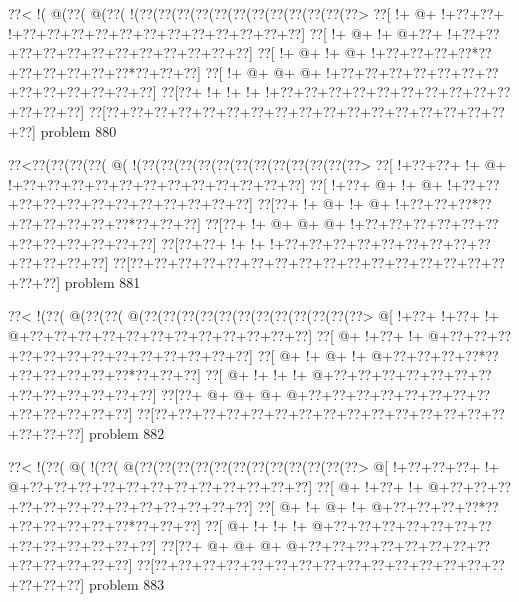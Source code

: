 \vbox{\vbox{\goo
\0??<\- !(\- @(\0??(\- @(\0??(\- !(\0??(\0??(\0??(\0??(\0??(\0??(\0??(\0??(\0??(\0??(\0??(\0??>
\0??[\- !+\- @+\- !+\0??+\0??+\- !+\0??+\0??+\0??+\0??+\0??+\0??+\0??+\0??+\0??+\0??+\0??+\0??]
\0??[\- !+\- @+\- !+\- @+\0??+\- !+\0??+\0??+\0??+\0??+\0??+\0??+\0??+\0??+\0??+\0??+\0??+\0??]
\0??[\- !+\- @+\- !+\- @+\- !+\0??+\0??+\0??+\0??*\0??+\0??+\0??+\0??+\0??+\0??*\0??+\0??+\0??]
\0??[\- !+\- @+\- @+\- @+\- !+\0??+\0??+\0??+\0??+\0??+\0??+\0??+\0??+\0??+\0??+\0??+\0??+\0??]
\0??[\0??+\- !+\- !+\- !+\- !+\0??+\0??+\0??+\0??+\0??+\0??+\0??+\0??+\0??+\0??+\0??+\0??+\0??]
\0??[\0??+\0??+\0??+\0??+\0??+\0??+\0??+\0??+\0??+\0??+\0??+\0??+\0??+\0??+\0??+\0??+\0??+\0??]
}
\hfil problem 880\hfil\break
}



\vbox{\vbox{\goo
\0??<\0??(\0??(\0??(\0??(\- @(\- !(\0??(\0??(\0??(\0??(\0??(\0??(\0??(\0??(\0??(\0??(\0??(\0??>
\0??[\- !+\0??+\0??+\- !+\- @+\- !+\0??+\0??+\0??+\0??+\0??+\0??+\0??+\0??+\0??+\0??+\0??+\0??]
\0??[\- !+\0??+\- @+\- !+\- @+\- !+\0??+\0??+\0??+\0??+\0??+\0??+\0??+\0??+\0??+\0??+\0??+\0??]
\0??[\0??+\- !+\- @+\- !+\- @+\- !+\0??+\0??+\0??*\0??+\0??+\0??+\0??+\0??+\0??*\0??+\0??+\0??]
\0??[\0??+\- !+\- @+\- @+\- @+\- !+\0??+\0??+\0??+\0??+\0??+\0??+\0??+\0??+\0??+\0??+\0??+\0??]
\0??[\0??+\0??+\- !+\- !+\- !+\0??+\0??+\0??+\0??+\0??+\0??+\0??+\0??+\0??+\0??+\0??+\0??+\0??]
\0??[\0??+\0??+\0??+\0??+\0??+\0??+\0??+\0??+\0??+\0??+\0??+\0??+\0??+\0??+\0??+\0??+\0??+\0??]
}
\hfil problem 881\hfil\break
}



\vbox{\vbox{\goo
\0??<\- !(\0??(\- @(\0??(\0??(\- @(\0??(\0??(\0??(\0??(\0??(\0??(\0??(\0??(\0??(\0??(\0??(\0??>
\- @[\- !+\0??+\- !+\0??+\- !+\- @+\0??+\0??+\0??+\0??+\0??+\0??+\0??+\0??+\0??+\0??+\0??+\0??]
\0??[\- @+\- !+\0??+\- !+\- @+\0??+\0??+\0??+\0??+\0??+\0??+\0??+\0??+\0??+\0??+\0??+\0??+\0??]
\0??[\- @+\- !+\- @+\- !+\- @+\0??+\0??+\0??+\0??*\0??+\0??+\0??+\0??+\0??+\0??*\0??+\0??+\0??]
\0??[\- @+\- !+\- !+\- !+\- @+\0??+\0??+\0??+\0??+\0??+\0??+\0??+\0??+\0??+\0??+\0??+\0??+\0??]
\0??[\0??+\- @+\- @+\- @+\- @+\0??+\0??+\0??+\0??+\0??+\0??+\0??+\0??+\0??+\0??+\0??+\0??+\0??]
\0??[\0??+\0??+\0??+\0??+\0??+\0??+\0??+\0??+\0??+\0??+\0??+\0??+\0??+\0??+\0??+\0??+\0??+\0??]
}
\hfil problem 882\hfil\break
}



\vbox{\vbox{\goo
\0??<\- !(\0??(\- @(\- !(\0??(\- @(\0??(\0??(\0??(\0??(\0??(\0??(\0??(\0??(\0??(\0??(\0??(\0??>
\- @[\- !+\0??+\0??+\0??+\- !+\- @+\0??+\0??+\0??+\0??+\0??+\0??+\0??+\0??+\0??+\0??+\0??+\0??]
\0??[\- @+\- !+\0??+\- !+\- @+\0??+\0??+\0??+\0??+\0??+\0??+\0??+\0??+\0??+\0??+\0??+\0??+\0??]
\0??[\- @+\- !+\- @+\- !+\- @+\0??+\0??+\0??+\0??*\0??+\0??+\0??+\0??+\0??+\0??*\0??+\0??+\0??]
\0??[\- @+\- !+\- !+\- !+\- @+\0??+\0??+\0??+\0??+\0??+\0??+\0??+\0??+\0??+\0??+\0??+\0??+\0??]
\0??[\0??+\- @+\- @+\- @+\- @+\0??+\0??+\0??+\0??+\0??+\0??+\0??+\0??+\0??+\0??+\0??+\0??+\0??]
\0??[\0??+\0??+\0??+\0??+\0??+\0??+\0??+\0??+\0??+\0??+\0??+\0??+\0??+\0??+\0??+\0??+\0??+\0??]
}
\hfil problem 883\hfil\break
}



